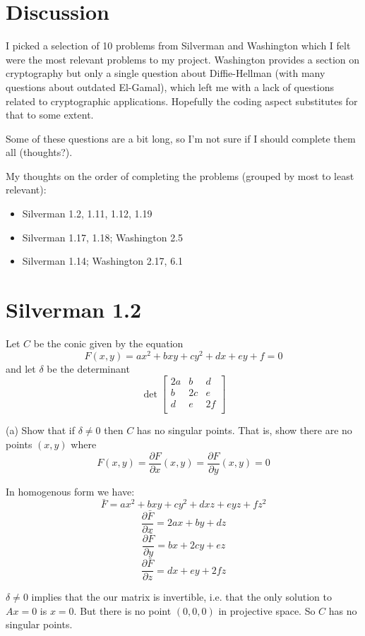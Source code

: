 \documentclass{article}
\begin{document}
\section*{Discussion}
I picked a selection of 10 problems from Silverman and Washington which I felt were the most relevant problems to my project. Washington provides a section on cryptography but only a single question about Diffie-Hellman (with many questions about outdated El-Gamal), which left me with a lack of questions related to cryptographic applications. Hopefully the coding aspect substitutes for that to some extent.

Some of these questions are a bit long, so I'm not sure if I should complete them all (thoughts?).

My thoughts on the order of completing the problems (grouped by most to least relevant):
\begin{itemize}
\item Silverman 1.2, 1.11, 1.12, 1.19
\item Silverman 1.17, 1.18; Washington 2.5
\item Silverman 1.14; Washington 2.17, 6.1
\end{itemize}

\section{Silverman 1.2}
Let $C$ be the conic given by the equation
$$F(x,y) = ax^2 + bxy + cy^2 + dx + ey + f = 0$$
and let $\delta$ be the determinant
$$\det \begin{bmatrix}
2a & b & d \\
b & 2c & e \\
d & e & 2f \\
\end{bmatrix}$$

(a) Show that if $\delta \neq 0$ then $C$ has no singular points. That is, show there are no points $(x,y)$ where
$$F(x,y) = \frac{\partial F}{\partial x}(x,y) = \frac{\partial F}{\partial y}(x,y) = 0$$

In homogenous form we have:
$$\bar F = ax^2 + bxy + cy^2 + dxz + eyz + fz^2$$
$$\frac{\partial \bar F}{\partial x} = 2ax + by + dz$$
$$\frac{\partial \bar F}{\partial y} = bx + 2cy + ez$$
$$\frac{\partial \bar F}{\partial z} = dx + ey + 2fz$$

$\delta \neq 0$ implies that the our matrix is invertible, i.e. that the only solution to $Ax = 0$ is $x = 0$. But there is no point $(0,0,0)$ in projective space. So $C$ has no singular points.
\end{document}
